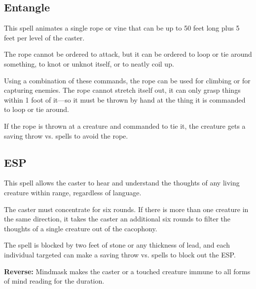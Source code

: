 \begin{multicols*}{2}
\subsection{Entangle}\label{spell:Entangle}

This spell animates a single rope or vine that can be up to 50 feet long plus 5 feet per level of the caster.

The rope cannot be ordered to attack, but it can be ordered to loop or tie around something, to knot or unknot itself, or to neatly coil up.

Using a combination of these commands, the rope can be used for climbing or for capturing enemies. The rope cannot stretch itself out, it can only grasp things within 1 foot of it—so it must be thrown by hand at the thing it is commanded to loop or tie around.

If the rope is thrown at a creature and commanded to tie it, the creature gets a saving throw vs. spells to avoid the rope.

\subsection{ESP}\label{spell:ESP}

This spell allows the caster to hear and understand the thoughts of any living creature within range, regardless of language.

The caster must concentrate for six rounds. If there is more than one creature in the same direction, it takes the caster an additional six rounds to filter the thoughts of a single creature out of the cacophony.

The spell is blocked by two feet of stone or any thickness of lead, and each individual targeted can make a saving throw vs. spells to block out the ESP.

\textbf{Reverse:} \hypertarget{spell:Mindmask}{Mindmask} makes the caster or a touched creature immune to all forms of mind reading for the duration.


\end{multicols*}
